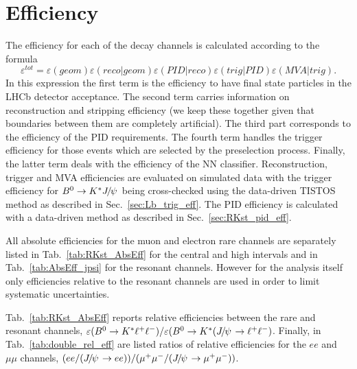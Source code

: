 \chapter{Efficiency}
\label{sec:Rkst_efficiency}


The efficiency for each of the decay channels is calculated according to the formula
\begin{equation}
\varepsilon^{tot}=\varepsilon(geom)\varepsilon(reco|geom)\varepsilon(PID|reco)\varepsilon(trig|PID)\varepsilon(MVA|trig).
\end{equation}
In this expression the first term is the efficiency to have final state particles in the LHCb detector 
acceptance. The second term carries information on reconstruction and stripping efficiency
(we keep these together given that boundaries between them are completely artificial).
The third part corresponds to the efficiency of the PID requirements.
The fourth term handles the trigger efficiency for those events which are selected by the preselection process.
Finally, the latter term deals with the efficiency of the NN classifier.
Reconstruction, trigger and MVA efficiencies are evaluated on simulated data with the trigger efficiency
for $\Bz\to\Kstar\jpsi$ being cross-checked using the data-driven TISTOS method as described in Sec.~\ref{sec:Lb_trig_eff}.
The PID efficiency is calculated with a data-driven method as described in Sec.~\ref{sec:RKst_pid_eff}.

All absolute efficiencies for the muon and electron rare channels are separately listed in Tab.~\ref{tab:RKst_AbsEff}
for the central and high \qsq intervals and in Tab.~\ref{tab:AbsEff_jpsi} for the resonant channels.
However for the analysis itself only efficiencies relative to the resonant channels are used in order
to limit systematic uncertainties.

Tab.~\ref{tab:RKst_AbsEff} reports relative efficiencies between the rare and resonant channels,
$\varepsilon(\Bz\to\Kstar \ell^+\ell^-)/\varepsilon(\Bz\to\Kstar(\jpsi\to \ell^+\ell^-)$.
Finally, in Tab.~\ref{tab:double_rel_eff} are listed ratios of relative efficiencies
for the $ee$ and $\mu\mu$ channels, $(ee/(\jpsi \to ee))/(\mumu/(\jpsi\to \mumu))$.

